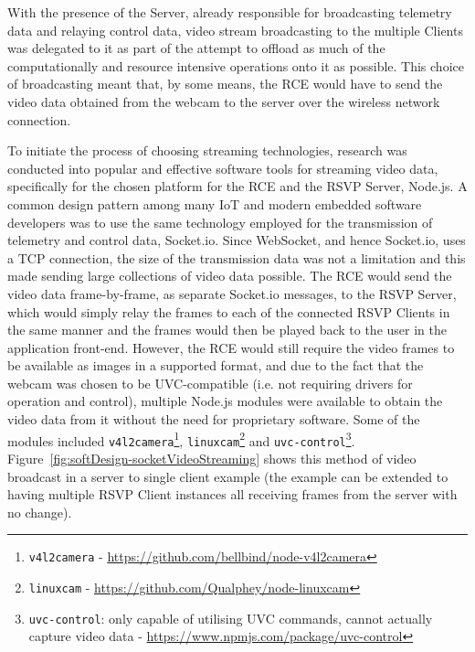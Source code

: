       With the presence of the Server, already responsible for broadcasting telemetry data and relaying control data, video stream broadcasting to the multiple Clients was delegated to it as part of the attempt to offload as much of the computationally and resource intensive operations onto it as possible. This choice of broadcasting meant that, by some means, the RCE would have to send the video data obtained from the webcam to the server over the wireless network connection.
      
      To initiate the process of choosing streaming technologies, research was conducted into popular and effective software tools for streaming video data, specifically for the chosen platform for the RCE and the RSVP Server, Node.js. A common design pattern among many IoT and modern embedded software developers was to use the same technology employed for the transmission of telemetry and control data, Socket.io. Since WebSocket, and hence Socket.io, uses a TCP connection, the size of the transmission data was not a limitation and this made sending large collections of video data possible. The RCE would send the video data frame-by-frame, as separate Socket.io messages, to the RSVP Server, which would simply relay the frames to each of the connected RSVP Clients in the same manner and the frames would then be played back to the user in the application front-end. However, the RCE would still require the video frames to be available as images in a supported format, and due to the fact that the webcam was chosen to be UVC-compatible (i.e. not requiring drivers for operation and control), multiple Node.js modules were available to obtain the video data from it without the need for proprietary software. Some of the modules included \texttt{v4l2camera}\footnote{\texttt{v4l2camera} - \url{https://github.com/bellbind/node-v4l2camera}}, \texttt{linuxcam}\footnote{\texttt{linuxcam} - \url{https://github.com/Qualphey/node-linuxcam}} and \texttt{uvc-control}\footnote{\texttt{uvc-control}: only capable of utilising UVC commands, cannot actually capture video data - \url{https://www.npmjs.com/package/uvc-control}}. Figure~\ref{fig:softDesign-socketVideoStreaming} shows this method of video broadcast in a server to single client example (the example can be extended to having multiple RSVP Client instances all receiving frames from the server with no change).
      
